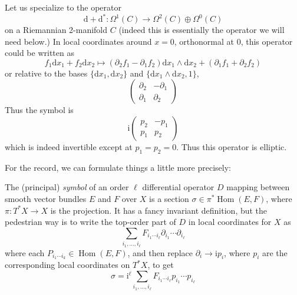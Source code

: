 \documentclass[12pt,letterpaper,reqno]{article}
\numberwithin{equation}{section}
\newcommand{\I}{{\mathrm i}}
\newcommand{\de}{\mathrm{d}}
\newcommand{\ti}[1]{\textit{#1}}
\DeclareMathOperator{\Hom}{Hom}
\begin{document}
Let us specialize to the operator
\begin{equation}
  \de + \de^*: \Omega^1(C) \to \Omega^2(C) \oplus \Omega^0(C)
\end{equation}
on a Riemannian 2-manifold $C$ (indeed this is essentially the
operator we will need below.)
In local coordinates around $x = 0$, orthonormal at $0$,
this operator could be written as
\begin{equation}
 f_1 \de x_1 + f_2 \de x_2 \mapsto (\partial_2 f_1 - \partial_1 f_2) \de x_1 \wedge \de x_2 + (\partial_1 f_1 + \partial_2 f_2)
\end{equation}
or relative to the bases $\{\de x_1, \de x_2\}$ and $\{\de x_1 \wedge \de x_2, 1\}$,
\begin{equation}
  \begin{pmatrix} \partial_2 & -\partial_1 \\ \partial_1 & \partial_2 \end{pmatrix}
\end{equation}
Thus the symbol is
\begin{equation}
  \I \begin{pmatrix} p_2 & -p_1 \\ p_1 & p_2 \end{pmatrix}
\end{equation}
which is indeed invertible except at $p_1 = p_2 = 0$.
Thus this operator is elliptic.

For the record, we can formulate things a little more precisely:
\begin{defn} \label{def:symbol}
The (principal)
\ti{symbol} of an order $\ell$ differential operator $D$ mapping
between smooth vector bundles $E$ and $F$ over $X$ is a section
$\sigma \in \pi^* \Hom(E,F)$, where $\pi: T^* X \to X$ is the projection.
It has a fancy invariant definition, but the pedestrian way is
to write the top-order part of $D$ in local coordinates for $X$ as
\begin{equation}
  \sum_{i_1, \dots, i_\ell} {F_{i_1 \cdots i_\ell}} \partial_{i_1} \cdots \partial_{i_\ell}
\end{equation}
where each $P_{i_1 \cdots i_k} \in \Hom(E,F)$, and then replace
$\partial_{i} \to \I p_i$, where $p_i$ are the corresponding local
coordinates on $T^* X$, to get
\begin{equation}
  \sigma = \I^\ell \sum_{i_1, \dots, i_\ell} {F_{i_1 \cdots i_\ell}} p_{i_1} \cdots p_{i_\ell}
\end{equation}
\end{defn}
\end{document}
